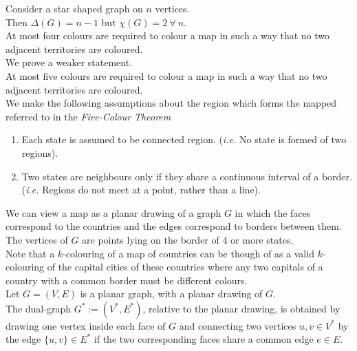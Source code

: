 \documentclass[11pt,a4paper]{article}
\begin{document}
Consider a star shaped graph on $n$ vertices.\\
Then $\Delta(G)=n-1$ but $\chi(G)=2\ \forall\ n$.\\

At most four colours are required to colour a map in such a way that no two adjacent territories are coloured.\\
\nb We prove a weaker statement.\\

At most five colours are required to colour a map in such a way that no two adjacent territories are coloured.\\

We make the following assumptions about the region which forms the mapped referred to in the \textit{Five-Colour Theorem}
\begin{enumerate}[label=\roman*)]
	\item Each state is assumed to be connected region. (\textit{i.e.} No state is formed of two regions).
	\item Two states are neighbours only if they share a continuous interval of a border. (\textit{i.e.} Regions do not meet at a point, rather than a line).
\end{enumerate}

We can view a map as a planar drawing of a graph $G$ in which the faces correspond to the countries and the edges correspond to borders between them.\\
The vertices of $G$ are points lying on the border of $4$ or more states.\\

Note that a $k$-colouring of a map of countries can be though of as a valid $k$-colouring of the capital cities of these countries where any two capitals of a country with a common border must be different colours.\\

Let $G=(V,E)$ is a planar graph, with a planar drawing of $G$.\\
The dual-graph $G^*:=(V^*,E^*)$, relative to the planar drawing, is obtained by drawing one vertex inside each face of $G$ and connecting two vertices $u,v\in V^*$ by the edge $\{u,v\}\in E^*$ if the two corresponding faces share a common edge $e\in E$.\\
\end{document}

